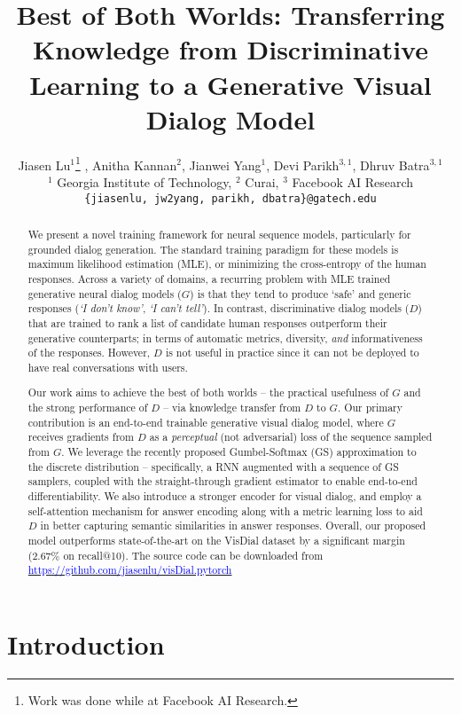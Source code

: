 \documentclass{article}
\title{Best of Both Worlds: Transferring Knowledge from Discriminative Learning to a Generative Visual Dialog Model}
\author{
  Jiasen Lu$^1$\thanks{Work was done while at Facebook AI Research.}  , Anitha Kannan$^2$\footnotemark[1]  , Jianwei Yang$^1$, Devi Parikh$^{3,1}$, Dhruv Batra$^{3,1}$\\
  $^1$ Georgia Institute of Technology, $^2$ Curai, $^3$ Facebook AI Research \\
{\tt\small \{jiasenlu, jw2yang, parikh, dbatra\}@gatech.edu}
}
\newcommand{\myquote}[1]{\emph{`#1'}}
\begin{document}
\maketitle
\begin{abstract}
We present a novel training framework for neural sequence models, particularly for grounded dialog generation. 
The standard training paradigm 
for these models is maximum likelihood estimation (MLE), or minimizing the cross-entropy of the human responses.
Across a variety of domains, a recurring problem with MLE trained generative neural dialog models ($G$) is that 
they tend to produce  `safe' and generic responses (\myquote{I don't know}, \myquote{I can't tell}). 
In contrast, discriminative dialog models ($D$) that are trained to rank a list of candidate human responses outperform their generative counterparts; 
in terms of automatic metrics, diversity, \emph{and} informativeness of the responses. 
However, $D$ is not useful in practice since it can not be deployed to have real conversations with users. 

Our work aims to achieve the best of both worlds -- the practical usefulness of $G$ and the strong performance of $D$ -- via knowledge transfer from $D$ to $G$.
Our primary contribution is  an end-to-end trainable generative visual dialog model, where $G$ receives gradients from $D$ as a \emph{perceptual} (not adversarial) loss
of the sequence sampled from $G$. 
We leverage the recently proposed Gumbel-Softmax (GS) approximation to the discrete distribution -- 
specifically, a RNN augmented with a sequence of GS samplers, coupled with the straight-through gradient estimator to enable end-to-end differentiability.
We also introduce a stronger encoder for visual dialog, and employ a self-attention mechanism for answer encoding along with a metric learning loss to aid $D$ in better capturing semantic similarities in answer responses. 
Overall, our proposed model outperforms state-of-the-art on the VisDial dataset by a significant margin (2.67\% on recall@10). The source code can be downloaded from \href{url}{\textcolor{blue}{https://github.com/jiasenlu/visDial.pytorch}}

\end{abstract}
\section{Introduction}
\label{sec:intro}
\end{document}
